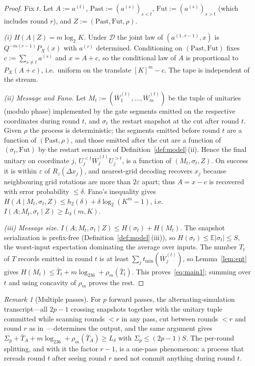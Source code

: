 \documentclass[aps,prx,twocolumn,superscriptaddress,nofootinbib,longbibliography]{revtex4-2}
\theoremstyle{plain}
\theoremstyle{definition}
\theoremstyle{remark}
\newtheorem{remark}{Remark}
\newcommand{\E}{\mathbb{E}}
\begin{document}
\begin{proof}
Fix $t$. Let $A:=a^{(t)}$, $\mathrm{Past}:=(a^{(s)})_{s<t}$, $\mathrm{Fut}:=(a^{(s)})_{s>t}$ (which includes round $r$), and $Z:=(\mathrm{Past},\mathrm{Fut},\rho)$.

\emph{(i) $H(A\mid Z)=m\log_2K$.} Under $\mathcal D$ the joint law of $(a^{(1..r-1)},x)$ is $Q^{-m(r-1)}P_X(x)$ with $a^{(r)}$ determined. Conditioning on $(\mathrm{Past},\mathrm{Fut})$ fixes $c:=\sum_{s\ne t}a^{(s)}$ and $x=A+c$, so the conditional law of $A$ is proportional to $P_X(A+c)$, i.e.\ uniform on the translate $[K]^m-c$. The tape is independent of the stream.

\emph{(ii) Message and Fano.} Let $M_t:=(\overline W^{(t)}_1,\dots,\overline W^{(t)}_m)$ be the tuple of unitaries (modulo phase) implemented by the gate segments emitted on the respective coordinates during round $t$, and $\sigma_t$ the restart snapshot at the cut after round $t$. Given $\rho$ the process is deterministic; the segments emitted before round $t$ are a function of $(\mathrm{Past},\rho)$, and those emitted after the cut are a function of $(\sigma_t,\mathrm{Fut})$ by the restart semantics of Definition~\ref{def:model}\,(ii). Hence the final unitary on coordinate $j$, $U^{<t}_j\overline W^{(t)}_jU^{>t}_j$, is a function of $(M_t,\sigma_t,Z)$. On success it is within $\varepsilon$ of $R_z(\Delta x_j)$, and nearest-grid decoding recovers $x_j$ because neighbouring grid rotations are more than $2\varepsilon$ apart; thus $A=x-c$ is recovered with error probability $\le\delta$. Fano's inequality gives $H(A\mid M_t,\sigma_t,Z)\le h_2(\delta)+\delta\log_2(K^m-1)$, i.e.\ $I(A;M_t,\sigma_t\mid Z)\ge L_\delta(m,K)$.

\emph{(iii) Message size.} $I(A;M_t,\sigma_t\mid Z)\le H(\sigma_t)+H(M_t)$. The snapshot serialization is prefix-free (Definition~\ref{def:model}\,(iii)), so $H(\sigma_t)\le\E|\sigma_t|\le S$, the worst-input expectation dominating the average over inputs. The number $T_t$ of $T$ records emitted in round $t$ is at least $\sum_jt_{\min}(\overline W^{(t)}_j)$, so Lemma~\ref{lem:ent} gives $H(M_t)\le\bar T_t+m\log_236+\rho_m(\bar T_t)$. This proves~\eqref{eq:main1}; summing over $t$ and using concavity of $\rho_m$ proves the rest.
\end{proof}

\begin{remark}[Multiple passes]
For $p$ forward passes, the alternating-simulation transcript---all $2p-1$ crossing snapshots together with the unitary tuple committed while scanning rounds $<r$ in any pass, cut between rounds $<r$ and round $r$ as in~\cite{Paper1}---determines the output, and the same argument gives $\Sigma_p+\bar T_A+m\log_236+\rho_m(\bar T_A)\ge L_\delta$ with $\Sigma_p\le(2p-1)S$. The per-round splitting, and with it the factor $r-1$, is a one-pass phenomenon: a process that rereads round $t$ after seeing round $r$ need not commit anything during round $t$.
\end{remark}
\end{document}
